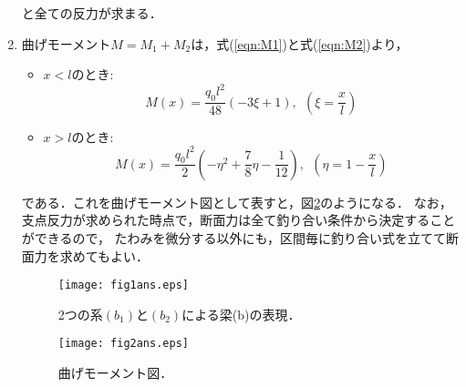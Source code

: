 \documentclass[10pt,a4j]{jarticle}
\begin{document}
\begin{enumerate}
\begin{equation}
\end{equation}
と全ての反力が求まる．
\item
曲げモーメント$M=M_1+M_2$は，式(\ref{eqn:M1})と式(\ref{eqn:M2})より，
\begin{itemize}
\item
	$x<l$のとき:
	\begin{equation}
		M(x)=\frac{q_0l^2}{48}( -3 \xi +1), \ \ \left( \xi=\frac{x}{l}\right)
		\label{eqn:M_left}
	\end{equation}
\item
	$x>l$のとき:
	\begin{equation}
		M(x)=\frac{q_0l^2}{2}\left( -\eta^2 +\frac{7}{8}\eta - \frac{1}{12}\right), \ \ 
		\left( \eta=1-\frac{x}{l}\right)
		\label{eqn:M_right}
	\end{equation}
\end{itemize}
である．これを曲げモーメント図として表すと，図\ref{fig:fig2}のようになる．
なお，支点反力が求められた時点で，断面力は全て釣り合い条件から決定することができるので，
たわみを微分する以外にも，区間毎に釣り合い式を立てて断面力を求めてもよい．
\begin{figure}[h]
	\begin{center}
	\texttt{[image: fig1ans.eps]} 
	\end{center}
	\caption{2つの系$(b_1)$と$(b_2)$による梁(b)の表現．}
	\label{fig:fig1}
\end{figure}
\begin{figure}[h]
	\begin{center}
	\texttt{[image: fig2ans.eps]} 
	\end{center}
	\caption{曲げモーメント図．}
	\label{fig:fig2}
\end{figure}
\end{enumerate}
\end{document}
